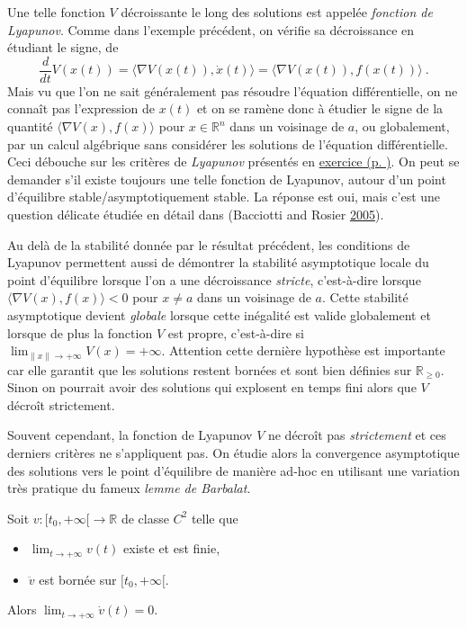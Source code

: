 \hypertarget{rem-crit_lyap}{}
\begin{remarque}\label{rem-crit_lyap}
Une telle fonction \(V\) décroissante le long des solutions est appelée
\emph{fonction de Lyapunov}. Comme dans l'exemple précédent, on vérifie
sa décroissance en étudiant le signe, de \[
\frac{d}{dt} V(x(t)) = \langle\nabla V (x(t)), \dot{x}(t)\rangle = \langle\nabla V (x(t)), f(x(t))\rangle \ .
\]
Mais vu que l'on ne sait généralement pas résoudre l'équation
différentielle, on ne connaît pas l'expression de \(x(t)\) et on se
ramène donc à étudier le signe de la quantité
\(\langle\nabla V (x), f(x)\rangle\) pour \(x\in \mathbb{R}^n\) dans un
voisinage de \(a\), ou globalement, par un calcul algébrique sans
considérer les solutions de l'équation différentielle. Ceci débouche sur
les critères de \emph{Lyapunov} présentés en
\protect\hyperlink{exo_lyap}{exercice (p. \pageref*{exo_lyap})}. On peut
se demander s'il existe toujours une telle fonction de Lyapunov, autour
d'un point d'équilibre stable/asymptotiquement stable. La réponse est
oui, mais c'est une question délicate étudiée en détail dans (Bacciotti
and Rosier \protect\hyperlink{ref-BacRos}{2005}).

Au delà de la stabilité donnée par le résultat précédent, les conditions
de Lyapunov permettent aussi de démontrer la stabilité asymptotique
locale du point d'équilibre lorsque l'on a une décroissance
\emph{stricte}, c'est-à-dire lorsque
\(\langle\nabla V (x), f(x)\rangle<0\) pour \(x\neq a\) dans un
voisinage de \(a\). Cette stabilité asymptotique devient \emph{globale}
lorsque cette inégalité est valide globalement et lorsque de plus la
fonction \(V\) est propre, c'est-à-dire si
\(\lim_{\|x\| \to +\infty} V(x) = +\infty\). Attention cette dernière
hypothèse est importante car elle garantit que les solutions restent
bornées et sont bien définies sur \(\mathbb{R}_{\geq 0}\). Sinon on
pourrait avoir des solutions qui explosent en temps fini alors que \(V\)
décroît strictement.

Souvent cependant, la fonction de Lyapunov \(V\) ne décroît pas
\emph{strictement} et ces derniers critères ne s'appliquent pas. On
étudie alors la convergence asymptotique des solutions vers le point
d'équilibre de manière ad-hoc en utilisant une variation très pratique
du fameux \emph{lemme de Barbalat}.
\end{remarque}

\hypertarget{theo_barbalat}{}
\begin{theoreme}\label{theo_barbalat}
Soit \(v:[t_0,+\infty[\to \mathbb{R}\) de classe \(C^2\) telle que

\begin{itemize}
\item
  \(\lim_{t\to +\infty} v(t)\) existe et est finie,
\item
  \(\ddot{v}\) est bornée sur \([t_0,+\infty[\).
\end{itemize}

Alors \(\lim_{t\to +\infty} \dot{v}(t) = 0\).
\end{theoreme}

